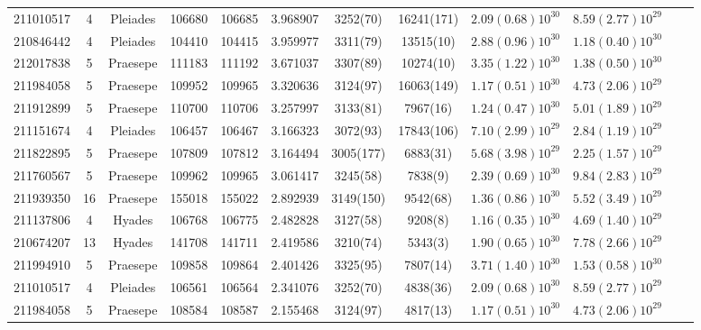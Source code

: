 \begin{tabular}{lccccccccccr}
 211010517 &   4 &  Pleiades &  106680 &  106685 &   3.968907 &             3252(70) &  16241(171) &        $2.09(0.68)10^{30}$ &     $8.59(2.77)10^{29}$ \\
 210846442 &   4 &  Pleiades &  104410 &  104415 &   3.959977 &             3311(79) &   13515(10) &        $2.88(0.96)10^{30}$ &     $1.18(0.40)10^{30}$ \\
 212017838 &   5 &  Praesepe &  111183 &  111192 &   3.671037 &             3307(89) &   10274(10) &        $3.35(1.22)10^{30}$ &     $1.38(0.50)10^{30}$ \\
 211984058 &   5 &  Praesepe &  109952 &  109965 &   3.320636 &             3124(97) &  16063(149) &        $1.17(0.51)10^{30}$ &     $4.73(2.06)10^{29}$ \\
 211912899 &   5 &  Praesepe &  110700 &  110706 &   3.257997 &             3133(81) &    7967(16) &        $1.24(0.47)10^{30}$ &     $5.01(1.89)10^{29}$ \\
 211151674 &   4 &  Pleiades &  106457 &  106467 &   3.166323 &             3072(93) &  17843(106) &        $7.10(2.99)10^{29}$ &     $2.84(1.19)10^{29}$ \\
 211822895 &   5 &  Praesepe &  107809 &  107812 &   3.164494 &            3005(177) &    6883(31) &        $5.68(3.98)10^{29}$ &     $2.25(1.57)10^{29}$ \\
 211760567 &   5 &  Praesepe &  109962 &  109965 &   3.061417 &             3245(58) &     7838(9) &        $2.39(0.69)10^{30}$ &     $9.84(2.83)10^{29}$ \\
 211939350 &  16 &  Praesepe &  155018 &  155022 &   2.892939 &            3149(150) &    9542(68) &        $1.36(0.86)10^{30}$ &     $5.52(3.49)10^{29}$ \\
 211137806 &   4 &    Hyades &  106768 &  106775 &   2.482828 &             3127(58) &     9208(8) &        $1.16(0.35)10^{30}$ &     $4.69(1.40)10^{29}$ \\
 210674207 &  13 &    Hyades &  141708 &  141711 &   2.419586 &             3210(74) &     5343(3) &        $1.90(0.65)10^{30}$ &     $7.78(2.66)10^{29}$ \\
 211994910 &   5 &  Praesepe &  109858 &  109864 &   2.401426 &             3325(95) &    7807(14) &        $3.71(1.40)10^{30}$ &     $1.53(0.58)10^{30}$ \\
 211010517 &   4 &  Pleiades &  106561 &  106564 &   2.341076 &             3252(70) &    4838(36) &        $2.09(0.68)10^{30}$ &     $8.59(2.77)10^{29}$ \\
 211984058 &   5 &  Praesepe &  108584 &  108587 &   2.155468 &             3124(97) &    4817(13) &        $1.17(0.51)10^{30}$ &     $4.73(2.06)10^{29}$ \\

\end{tabular}
